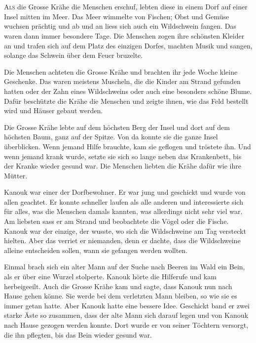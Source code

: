 \chapter*{}
\lettrine[lines=3]{\color{DeepPink}A}{ls} die Grosse Krähe die Menschen
erschuf, lebten diese in einem Dorf auf einer Insel mitten im Meer. Das Meer
wimmelte von Fischen; Obst und Gemüse wuchsen prächtig und ab und an liess sich
auch ein Wildschwein fangen. Das waren dann immer besondere Tage. Die Menschen
zogen ihre schönsten Kleider an und trafen sich auf dem Platz des einzigen
Dorfes, machten Musik und sangen, solange das Schwein über dem Feuer bruzelte.

Die Menschen achteten die Grosse Krähe und brachten ihr jede Woche kleine Geschenke. Das waren meistens Muscheln, die die Kinder am Strand gefunden hatten oder der Zahn eines Wildschweins oder auch eine besonders schöne Blume. Dafür beschützte die Krähe die Menschen und zeigte ihnen, wie das Feld bestellt wird und Häuser gebaut werden.

Die Grosse Krähe lebte auf dem höchsten Berg der Insel und dort auf dem höchsten Baum, ganz auf der Spitze. Von da konnte sie die ganze Insel überblicken. Wenn jemand Hilfe brauchte, kam sie geflogen und tröstete ihn. Und wenn jemand krank wurde, setzte sie sich so lange neben das Krankenbett, bis der Kranke wieder gesund war. Die Menschen liebten die Krähe dafür wie ihre Mütter.

Kanouk war einer der Dorfbewohner. Er war jung und geschickt und wurde von allen geachtet. Er konnte schneller laufen als alle anderen und interessierte sich für alles, was die Menschen damals kannten, was allerdings nicht sehr viel war. Am liebsten sass er am Strand und beobachtete die Vögel oder die Fische. Kanouk war der einzige, der wusste, wo sich die Wildschweine am Tag versteckt hielten. Aber das verriet er niemanden, denn er dachte, dass die Wildschweine alleine entscheiden sollen, wann sie gefangen werden wollten.

Einmal brach sich ein alter Mann auf der Suche nach Beeren im Wald ein Bein, als er über eine Wurzel stolperte. Kanouk hörte die Hilferufe und kam herbeigeeilt. Auch die Grosse Krähe kam und sagte, dass Kanouk nun nach Hause gehen könne. Sie werde bei dem verletzten Mann bleiben, so wie sie es immer getan hatte. Aber Kanouk hatte eine bessere Idee. Geschickt band er zwei starke Äste so zusammen, dass der alte Mann sich darauf legen und von Kanouk nach Hause gezogen werden konnte. Dort wurde er von seiner Töchtern versorgt, die ihn pflegten, bis das Bein wieder gesund war.

